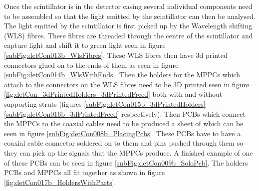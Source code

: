 Once the scintillator is in the detector casing several individual components need to be assembled so that the light emitted by the scintillator can then be analysed. The light emitted by the scintillator is first picked up by the Wavelength shifting (WLS) fibres. These fibres are threaded through the centre of the scintillator and capture light and shift it to green light seen in figure \ref{subFig:detCon013b_WlsFibres}. These WLS fibres then have 3d printed connectors glued on to the ends of them as seen in figure \ref{subFig:detCon014b_WlsWithEnds}. Then the holders for the MPPCs which attach to the connectors on the WLS fibres need to be 3D printed seen in figure \ref{fig:detCon_3dPrintedHolders_3dPrintedFreed} both with and without supporting struts (figures \ref{subFig:detCon015b_3dPrintedHolders} \ref{subFig:detCon016b_3dPrintedFreed} respectively). Then PCBs which connect the MPPCs to the coaxial cables need to be produced a sheet of which can be seen in figure \ref{subFig:detCon008b_PlacingPcbs}. These PCBs have to have a coaxial cable connector soldered on to them and pins pushed through them so they can pick up the signals that the MPPCs produce. A finished example of one of these PCBs can be seen in figure \ref{subFig:detCon009b_SoloPcb}. The holders PCBs and MPPCs all fit together as shown in figure \ref{fig:detCon017b_HoldersWithParts}.

